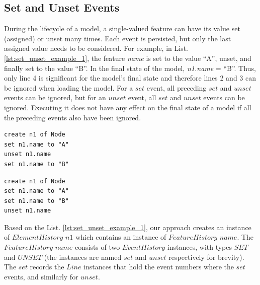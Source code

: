 \documentclass{llncs}
\begin{document}
\vspace{-20pt}
\subsection{Set and Unset Events}
\label{subsec:set_and_unset_operations}

\vspace{-10pt}
During the lifecycle of a model, a single-valued feature can have its value set (assigned) or unset many times. Each event is persisted, but only the last assigned value needs to be considered. For example, in List. \ref{lst:set_unset_example_1}, the feature \emph{name} is set to the value ``A'', unset, and finally set to the value ``B''.  In the final state of the model, \emph{n1.name} = ``B''. Thus, only line 4 is significant for the model's final state and therefore lines 2 and 3 can be ignored when loading the model. For a $set$ event, all preceding $set$ and $unset$ events can be ignored, but for an $unset$ event, all $set$ and $unset$ events can be ignored. Executing it does not have any effect on the final state of a model if all the preceding events also have been ignored. 

\vspace{-15pt}
\begin{minipage}[t]{0.49\linewidth}
\begin{lstlisting}[style=eol,caption={A CBP representation of attribute \emph{name} assignments.},label=lst:set_unset_example_1]
create n1 of Node
set n1.name to "A"
unset n1.name
set n1.name to "B"
\end{lstlisting}
\end{minipage}
\hfill
\begin{minipage}[t]{0.49\linewidth}
\begin{lstlisting}[style=eol,caption={A CBP representation of attribute \emph{name} assignments.},label=lst:set_unset_example_2]
create n1 of Node
set n1.name to "A"
set n1.name to "B"
unset n1.name
\end{lstlisting}
\end{minipage}

Based on the List. \ref{lst:set_unset_example_1}, our approach creates an instance of $ElementHistory$ $n1$ which contains an instance of $FeatureHistory$ $name$. The $FeatureHistory$ $name$ consists of two $EventHistory$ instances, with types $SET$ and $UNSET$ (the instances are named $set$ and $unset$ respectively for brevity). The $set$ records the $Line$ instances that hold the event numbers where the $set$ events, and similarly for $unset$.
\end{document}
